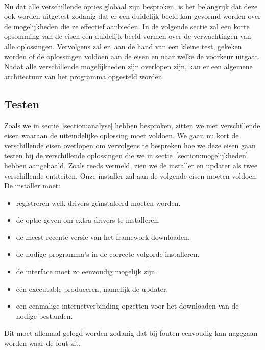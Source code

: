 \documentclass{article}
\begin{document}
\paragraph{}
Nu dat alle verschillende opties globaal zijn besproken, is het belangrijk dat deze ook worden uitgetest zodanig dat er een duidelijk beeld kan gevormd worden over de mogelijkheden die ze effectief aanbieden.
In de volgende sectie zal een korte opsomming van de eisen een duidelijk beeld vormen over de verwachtingen van alle oplossingen.
Vervolgens zal er, aan de hand van een kleine test, gekeken worden of de oplossingen voldoen aan de eisen en naar welke de voorkeur uitgaat.
Nadat alle verschillende mogelijkheden zijn overlopen zijn, kan er een algemene architectuur van het programma opgesteld worden.

\subsection{Testen}
Zoals we in sectie~\vref{section:analyse} hebben besproken, zitten we met verschillende eisen waaraan de uiteindelijke oplossing moet voldoen.
We gaan nu kort de verschillende eisen overlopen om vervolgens te bespreken hoe we deze eisen gaan testen bij de verschillende oplossingen die we in sectie~\vref{section:mogelijkheden} hebben aangehaald.
Zoals reeds vermeld, zien we de installer en updater als twee verschillende entiteiten.
Onze installer zal aan de volgende eisen moeten voldoen.
De installer moet:
\begin{itemize}
\item registreren welk drivers ge\"instaleerd moeten worden.
\item de optie geven om extra drivers te installeren.
\item de meest recente versie van het framework downloaden.
\item de nodige programma's in de correcte volgorde installeren.
\item de interface moet zo eenvoudig mogelijk zijn.
\item \'e\'en executable produceren, namelijk de updater.
\item een eenmalige internetverbinding opzetten voor het downloaden van de nodige bestanden.
\end{itemize}
Dit moet allemaal gelogd worden zodanig dat bij fouten eenvoudig kan nagegaan worden waar de fout zit.
\end{document}
